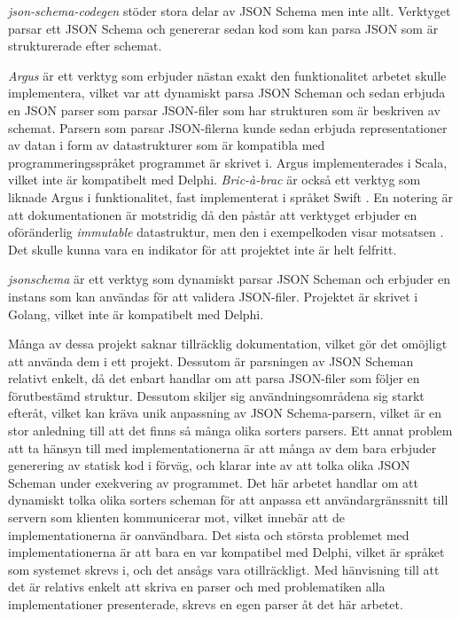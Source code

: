 \textit{json-schema-codegen} stöder stora delar av JSON Schema men inte allt. Verktyget parsar ett JSON Schema och genererar sedan kod som kan parsa JSON som är strukturerade efter schemat. \cite{Tundra}

\textit{Argus} är ett verktyg som erbjuder nästan exakt den funktionalitet arbetet skulle implementera, vilket var att dynamiskt parsa JSON Scheman och sedan erbjuda en JSON parser som parsar JSON-filer som har strukturen som är beskriven av schemat. Parsern som parsar JSON-filerna kunde sedan erbjuda representationer av datan i form av datastrukturer som är kompatibla med programmeringsspråket programmet är skrivet i. Argus implementerades i Scala, vilket inte är kompatibelt med Delphi. \cite{Fenton} \textit{Bric-à-brac} är också ett verktyg som liknade Argus i funktionalitet, fast implementerat i språket Swift \cite{GlimpseI/OInc}. En notering är att dokumentationen är motstridig då den påstår att verktyget erbjuder en oföränderlig \textit{immutable} datastruktur, men den i exempelkoden visar motsatsen \cite{GlimpseI/OInc}. Det skulle kunna vara en indikator för att projektet inte är helt felfritt.

\textit{jsonschema} är ett verktyg som dynamiskt parsar JSON Scheman och erbjuder en instans som kan användas för att validera JSON-filer. Projektet är skrivet i Golang, vilket inte är kompatibelt med Delphi. \cite{Qriinc.}

Många av dessa projekt saknar tillräcklig dokumentation, vilket gör det omöjligt att använda dem i ett projekt. Dessutom är parsningen av JSON Scheman relativt enkelt, då det enbart handlar om att parsa JSON-filer som följer en förutbestämd struktur. Dessutom skiljer sig användningsområdena sig starkt efteråt, vilket kan kräva unik anpassning av JSON Schema-parsern, vilket är en stor anledning till att det finns så många olika sorters parsers. Ett annat problem att ta hänsyn till med implementationerna är att många av dem bara erbjuder generering av statisk kod i förväg, och klarar inte av att tolka olika JSON Scheman under exekvering av programmet. Det här arbetet handlar om att dynamiskt tolka olika sorters scheman för att anpassa ett användargränssnitt till servern som klienten kommunicerar mot, vilket innebär att de implementationerna är oanvändbara. Det sista och största problemet med implementationerna är att bara en var kompatibel med Delphi, vilket är språket som systemet skrevs i, och det ansågs vara otillräckligt. Med hänvisning till att det är relativs enkelt att skriva en parser och med problematiken alla implementationer presenterade, skrevs en egen parser åt det här arbetet.

